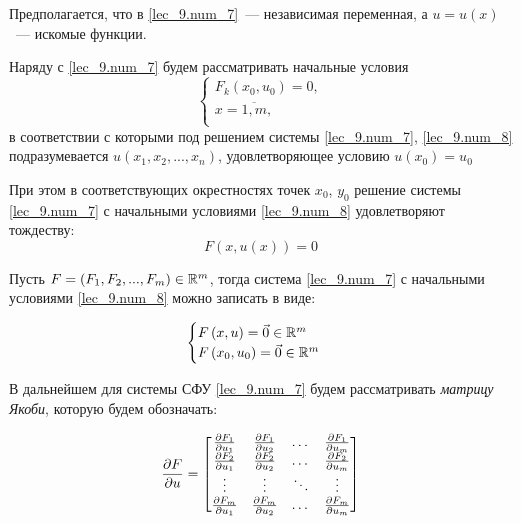 \documentclass[../../main.tex]{subfiles}
\begin{document}
Предполагается, что в \eqref{lec_9.num_7}~--- независимая
переменная, а $u = u\left(x\right)$~--- искомые функции.

Наряду с \eqref{lec_9.num_7} будем рассматривать начальные условия
\begin{equation}
    \label{lec_9.num_8}
    \begin{cases}
        F_k\left(x_0, u_0\right) = 0, \\
        x = \overline{1, m}, \\
    \end{cases}
\end{equation}
в соответствии с которыми под решением системы
\eqref{lec_9.num_7}, \eqref{lec_9.num_8}
подразумевается $u(x_1, x_2, ..., x_n)$,
удовлетворяющее условию
$u\left(x_0\right) = u_0$

При этом в соответствующих окрестностях точек $x_0$, $y_0$
решение системы \eqref{lec_9.num_7}
с начальными условиями 
\eqref{lec_9.num_8} удовлетворяют тождеству:
\[F(x, u(x)) = 0\]

Пусть $F = \left(F_1, F_2, ...,F_m\right) \in \mathbb{R}^m$,
тогда система \eqref{lec_9.num_7}
с начальными условиями 
\eqref{lec_9.num_8} можно записать в виде:

\begin{equation}
    \label{lec_9.num_9}
    \begin{cases}
     F\left(x, u\right) = \vec{0} \in \mathbb{R}^m\\
     F\left(x_0, u_0\right) = \vec{0} \in \mathbb{R}^m\\
    \end{cases}
\end{equation}


В дальнейшем для системы СФУ \eqref{lec_9.num_7} 
будем рассматривать \emph{матрицу Якоби}, которую будем обозначать:

\begin{equation}
    \label{lec_9.num_10}
    \frac{\partial F}{\partial u} =
    \begin{bmatrix}
        \frac{\partial F_1}{\partial u_1} & \frac{\partial F_1}{\partial u_2} & \dots & 
        \frac{\partial F_1}{\partial u_m} \\
        \frac{\partial F_2}{\partial u_1} & \frac{\partial F_2}{\partial u_2} &\dots & 
        \frac{\partial F_2}{\partial u_m} \\
        \vdots & \vdots & \ddots & \vdots \\
        \frac{\partial F_m}{\partial u_1} & \frac{\partial F_m}{\partial u_2} & \dots & 
        \frac{\partial F_m}{\partial u_m}
    \end{bmatrix}
\end{equation}
\end{document}
